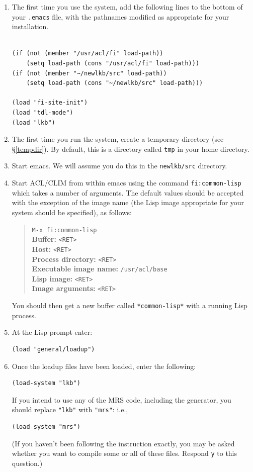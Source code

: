 \documentclass[12pt]{report}
\newcommand{\filename}[1]{{\tt #1}}
\begin{document}
\begin{enumerate}
\item The first time you use the system,
add the following lines to the bottom of your \filename{.emacs}
file, with the pathnames modified as appropriate for your
installation.
\begin{verbatim}

(if (not (member "/usr/acl/fi" load-path))
    (setq load-path (cons "/usr/acl/fi" load-path)))
(if (not (member "~/newlkb/src" load-path))
    (setq load-path (cons "~/newlkb/src" load-path)))
        
(load "fi-site-init")
(load "tdl-mode")
(load "lkb")
\end{verbatim}
\item The first time you run the system,
create a temporary directory (see \S\ref{tempdir}).  By default, this is
a directory called \filename{tmp} in your home directory.
\item Start emacs.  We will assume you
do this in the \filename{newlkb/src} directory.
\item Start ACL/CLIM from within emacs using the 
command \verb+fi:common-lisp+ which takes a number
of arguments. The
default values should be accepted with the exception
of the image name (the Lisp image appropriate for your
system should be specified), as follows:
\begin{quote}
\verb+M-x fi:common-lisp+\\
{\bf Buffer:} \verb+<RET>+\\
{\bf Host:} \verb+<RET>+\\
{\bf Process directory:} \verb+<RET>+\\
{\bf Executable image name:} \verb+/usr/acl/base+\\
{\bf Lisp image:}  \verb+<RET>+\\
{\bf Image arguments:}  \verb+<RET>+
\end{quote}
You should then get a new buffer called \verb+*common-lisp*+ with
a running Lisp process.  
\item At the Lisp prompt enter:
\begin{verbatim}
(load "general/loadup") 
\end{verbatim}
\item Once the loadup files have been loaded, enter the following:
\begin{verbatim}
(load-system "lkb")
\end{verbatim}
If you intend to use any of the MRS code, including the generator,
you should replace \verb+"lkb"+ with \verb+"mrs"+: i.e.,
\begin{verbatim}
(load-system "mrs")
\end{verbatim}
(If you haven't been following the instruction exactly, you may be asked whether
you want to compile some or all of these files.  Respond {\tt y} to this
question.)
\end{enumerate}
\end{document}
